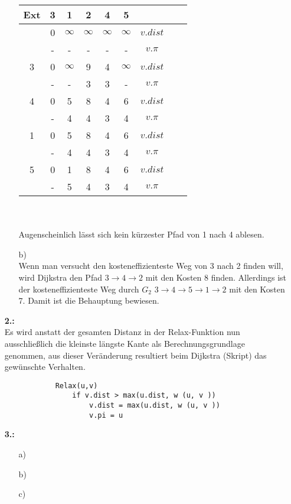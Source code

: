 \documentclass[a4paper,11pt,fleqn]{scrartcl}
\begin{document}
\begin{enumerate}
\begin{enumerate}
\begin{tabular}{c||c|c|c|c|c|c|c|c}
                Ext & 3 & 1 & 2 & 4 & 5 & \\ \hline \hline
				& 0 & $\infty$ & $\infty$ & $\infty$ & $\infty$ & $v.dist$ \\ \hline
                & - & - & - & - & - & $v.\pi$ \\ \hline
				3 & 0 & $\infty$ & 9 & 4 & $\infty$ & $v.dist$ \\ \hline
				& - & - & 3 & 3 & - & $v.\pi$ \\ \hline
				4 & 0 & 5 & 8 & 4 & 6 & $v.dist$ \\ \hline
				& - & 4 & 4 & 3 & 4 & $v.\pi$ \\ \hline
				1 & 0 & 5 & 8 & 4 & 6 & $v.dist$ \\ \hline
				& - & 4 & 4 & 3 & 4 & $v.\pi$ \\ \hline
				5 & 0 & 1 & 8 & 4 & 6 & $v.dist$ \\ \hline
				& - & 5 & 4 & 3 & 4 & $v.\pi$ \\
			\end{tabular} \\ \\
			Augenscheinlich lässt sich kein kürzester Pfad von 1 nach 4 ablesen.
			\item[b)] \quad \\
			Wenn man versucht den kosteneffizienteste Weg von 3 nach 2 finden will, wird Dijkstra den Pfad 
			\(3 \to 4 \to 2\) mit den Kosten 8 finden. Allerdings ist der kosteneffizienteste Weg durch
			\(G_2\) \(3 \to 4 \to 5 \to 1 \to 2\) mit den Kosten 7. Damit ist die Behauptung bewiesen.
		\end{enumerate}
		\item[\textbf{2.:}] \quad \\
		Es wird anstatt der gesamten Distanz in der Relax-Funktion nun ausschließlich die kleinste längste
		Kante als Berechnungsgrundlage genommen, aus dieser Veränderung resultiert beim Dijkstra (Skript) 
		das gewünschte Verhalten.
		\begin{verbatim}
			Relax(u,v)
			    if v.dist > max(u.dist, w (u, v ))
			        v.dist = max(u.dist, w (u, v ))
			        v.pi = u
		\end{verbatim}
		\item[\textbf{3.:}]
		\begin{enumerate}
			\item[a)] \quad \\
			\todo
			\item[b)] \quad \\
			\todo
			\item[c)] \quad \\

\end{enumerate}
\end{enumerate}
\end{document}
